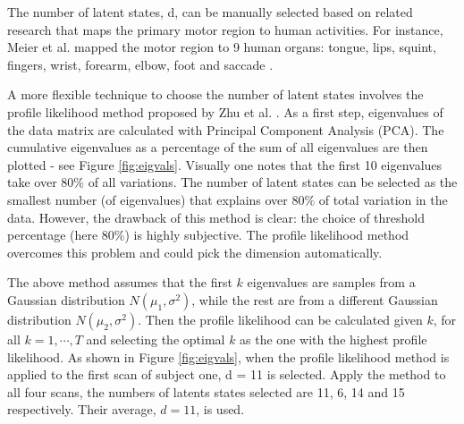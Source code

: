 \documentclass[fleqn]{article}
\let\oldref\ref
\renewcommand{\ref}[1]{(\oldref{#1})}
\begin{document}
The number of latent states, d, can be manually selected based on related research that maps the primary motor region to human activities. For instance, Meier et al. mapped the motor region to 9 human organs: tongue, lips, squint, fingers, wrist, forearm, elbow, foot and saccade \cite{meier2008complex}.

A more flexible technique to choose the number of latent states involves the profile likelihood method proposed by Zhu et al. \cite{zhu2006automatic}. As a first step, eigenvalues of the data matrix are calculated with Principal Component Analysis (PCA). The cumulative eigenvalues as a percentage of the sum of all eigenvalues are then plotted - see Figure \oldref{fig:eigvals}. Visually one notes that the first 10 eigenvalues take over $80\%$ of all variations. The number of latent states can be selected as the smallest number (of eigenvalues) that explains over $80\%$ of total variation in the data. However, the drawback of this method is clear: the choice of threshold percentage (here $80\%$) is highly subjective. The profile likelihood method overcomes this problem and could pick the dimension automatically.

The above method assumes that the first $k$ eigenvalues are samples from a Gaussian distribution $N(\mu_1,\sigma^2)$, while the rest are from a different Gaussian distribution $N(\mu_2,\sigma^2)$. Then the profile likelihood can be calculated given $k$, for all $k=1,\cdots,T$ and selecting the optimal $k$ as the one with the highest profile likelihood. As shown in Figure \oldref{fig:eigvals}, when the profile likelihood method is applied to the first scan of subject one, d = 11 is selected. Apply the method to all four scans, the numbers of latents states selected are 11, 6, 14 and 15 respectively. Their average, $d=11$, is used.
\end{document}
